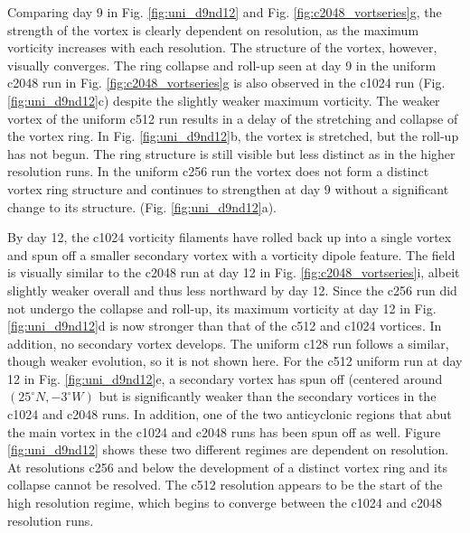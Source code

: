 Comparing day 9 in Fig. \ref{fig:uni_d9nd12} and Fig. \ref{fig:c2048_vortseries}g,
the strength of the vortex is clearly dependent on resolution, as the maximum vorticity
increases with each resolution. The structure of the vortex, however, visually 
converges. The ring collapse and roll-up seen at day 9 in the 
uniform c2048 run in Fig. \ref{fig:c2048_vortseries}g
is also observed in the c1024 run (Fig. \ref{fig:uni_d9nd12}c) 
despite the slightly weaker maximum vorticity.
The weaker vortex of the uniform c512 run results in a delay of the 
stretching and collapse of the vortex ring. In Fig. \ref{fig:uni_d9nd12}b,
the vortex is stretched, but the roll-up has not begun. The ring
structure is still visible but less distinct as in the higher resolution runs.
In the uniform c256 run the vortex does not form a distinct vortex ring structure 
and continues to strengthen at day 9 without a significant
change to its structure. (Fig. \ref{fig:uni_d9nd12}a).

By day 12, the c1024 vorticity filaments have rolled back up into a single vortex and spun off
a smaller secondary vortex with a vorticity dipole feature. The field is visually
similar to the c2048 run at day 12 in Fig. \ref{fig:c2048_vortseries}i, 
albeit slightly weaker overall and thus less northward by day 12. 
Since the c256 run did not undergo the collapse and roll-up,
its maximum vorticity at day 12 in Fig. \ref{fig:uni_d9nd12}d is now stronger 
than that of the c512 and c1024 vortices.  In addition, no secondary vortex develops.
The uniform c128 run follows a similar, though weaker evolution, so it is not shown here. 
For the c512 uniform run at day 12 in Fig. \ref{fig:uni_d9nd12}e, a secondary vortex has spun off 
(centered around $(25^\circ N, -3^\circ W)$ but is significantly weaker than the secondary vortices 
in the c1024 and c2048 runs. In addition, one of the two anticyclonic regions that abut the main 
vortex in the c1024 and c2048 runs has been spun off as well. Figure \ref{fig:uni_d9nd12}
shows these two different regimes are dependent on resolution. At resolutions c256 and below
the development of a distinct vortex ring and its collapse cannot be resolved. The c512
resolution appears to be the start of the high resolution regime, 
which begins to converge between the c1024 and c2048 resolution runs.

